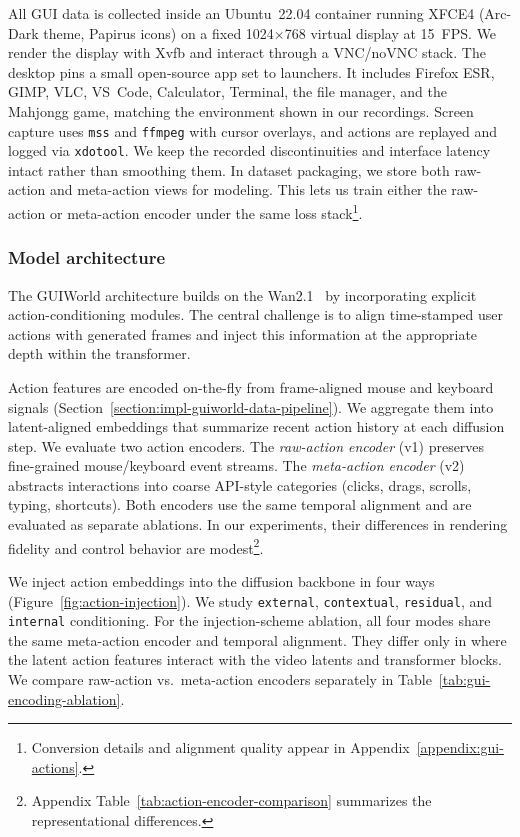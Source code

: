 All GUI data is collected inside an Ubuntu~22.04 container running XFCE4 (Arc-Dark theme, Papirus icons) on a fixed 1024$\times$768 virtual display at 15~FPS.
We render the display with Xvfb and interact through a VNC/noVNC stack.
The desktop pins a small open-source app set to launchers.
It includes Firefox ESR, GIMP, VLC, VS~Code, Calculator, Terminal, the file manager, and the Mahjongg game, matching the environment shown in our recordings.
Screen capture uses \texttt{mss} and \texttt{ffmpeg} with cursor overlays, and actions are replayed and logged via \texttt{xdotool}.
%
We keep the recorded discontinuities and interface latency intact rather than smoothing them.
In dataset packaging, we store both raw-action and meta-action views for modeling.
This lets us train either the raw-action or meta-action encoder under the same loss stack\footnote{Conversion details and alignment quality appear in Appendix~\ref{appendix:gui-actions}.}.







\subsubsection{Model architecture}


The GUIWorld architecture builds on the Wan2.1~\citep{wan2025wan} by incorporating explicit action-conditioning modules.
The central challenge is to align time-stamped user actions with generated frames and inject this information at the appropriate depth within the transformer.


Action features are encoded on-the-fly from frame-aligned mouse and keyboard signals (Section~\ref{section:impl-guiworld-data-pipeline}).
We aggregate them into latent-aligned embeddings that summarize recent action history at each diffusion step.
%
We evaluate two action encoders.
The \emph{raw-action encoder} (v1) preserves fine-grained mouse/keyboard event streams.
The \emph{meta-action encoder} (v2) abstracts interactions into coarse API-style categories (clicks, drags, scrolls, typing, shortcuts).
Both encoders use the same temporal alignment and are evaluated as separate ablations.
In our experiments, their differences in rendering fidelity and control behavior are modest\footnote{Appendix Table~\ref{tab:action-encoder-comparison} summarizes the representational differences.}.


We inject action embeddings into the diffusion backbone in four ways (Figure~\ref{fig:action-injection}).
We study \texttt{external}, \texttt{contextual}, \texttt{residual}, and \texttt{internal} conditioning.
For the injection-scheme ablation, all four modes share the same meta-action encoder and temporal alignment.
They differ only in where the latent action features interact with the video latents and transformer blocks.
We compare raw-action vs.\ meta-action encoders separately in Table~\ref{tab:gui-encoding-ablation}.



